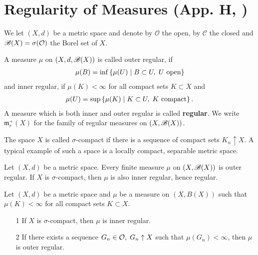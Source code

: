 \section{Regularity of Measures \tiny{(App. H, \cite{schilling2017measures})}}

We let $(X,d)$ be a metric space and denote by $\mathcal O$ the open, by $\mathcal C$ the closed and $\mathscr{B}(X)=\sigma(\mathcal O)$ the Borel set of $X$.

\begin{definition}
    A measure $\mu$ on $(X,d,\mathscr{B}(X))$ is called outer regular, if \begin{align}
        \mu(B) = \inf\left\{\mu(U)\hspace{1mm}|\hspace{1mm} B\subset U,\hspace{1mm} U \text{ open} \right\}
    \end{align}
    and inner regular, if $\mu(K)<\infty$ for all compact sets $K\subset X$ and \begin{align}
        \mu(U) = \sup\left\{\mu(K)\hspace{1mm}|\hspace{1mm} K\subset U,\hspace{1mm} K \text{ compact} \right\}.
    \end{align}
    A measure which is both inner and outer regular is called \textbf{regular}. We write $\mathfrak m_r^+(X)$ for the family of 
    regular measures on $(X,\mathscr{B}(X))$.
\end{definition}

\begin{remark}
    The space $X$ is called $\sigma$-compact if there is a sequence of compact sets $K_n\uparrow X$. A typical example of such a space 
    is a locally compact, separable metric space.
\end{remark}

\begin{theorem}
    Let $(X,d)$ be a metric space. Every finite measure $\mu$ on $(X,\mathscr{B}(X))$ is outer regular. If $X$ is $\sigma$-compact, then $\mu$ is also inner regular, hence regular.
\end{theorem}
\begin{theorem}
    Let $(X,d)$ be a metric space and $\mu$ be a measure on $(X,B(X))$ such that $\mu(K)<\infty$ for all compact sets $K\subset X$.
\end{theorem}
\begin{itemize}
    \item[1] If $X$ is $\sigma$-compact, then $\mu$ is inner regular.
    \item[2] If there exists a sequence $G_n\in\mathcal O,\hspace{1mm} G_n\uparrow X$ such that $\mu(G_n)<\infty$, then $\mu$ is outer regular.   
\end{itemize}